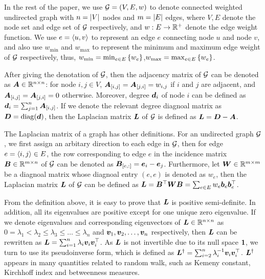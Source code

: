 \documentclass[sigconf]{acmart}
\begin{document}
In the rest of the paper, we use \(\mathcal{G}=(V,E,w)\) to denote connected weighted undirected graph with \(n=\left|V \right|\) nodes and \(m=\left|E \right|\) edges, where \(V,E\) denote the node set and edge set of \(\mathcal{G}\) respectively, and \(w:E\to\mathbb{R}^+\) denote the edge weight function.
We use \(e=\langle u, v \rangle\) to represent an edge \(e\) connecting node \(u\) and node \(v\), and also use \(w_{\min}\) and \(w_{\max}\) to represent the minimum and maximum edge weight of \(\mathcal{G}\) respectively, thus, \(w_{\min}=\min_{e\in E}\left\{w_e \right\}\),\(w_{\max}=\max_{e\in E}\left\{w_e \right\}\).

After giving the denotation of \(\mathcal{G}\), then the adjacency matrix of \(\mathcal{G}\) can be denoted as \(\boldsymbol{A}\in \mathbb{R}^{n\times n}\): for node \(i,j\in V\), \(\boldsymbol{A}_{[i,j]}=\boldsymbol{A}_{[j,i]}=w_{i,j}\) if \(i\) and \(j\) are adjacent, and \(\boldsymbol{A}_{[i,j]}=\boldsymbol{A}_{[j,i]}=0\) otherwise.
Moreover, degree \(\boldsymbol{d}_i\) of node \(i\) can be defined as \(\boldsymbol{d}_i=\sum_{j=1}^n\boldsymbol{A}_{[i,j]}\).
If we denote the relevant degree diagnoal matrix as \(\boldsymbol{D}={\rm{diag}}(\boldsymbol{d})\), then the Laplacian matrix \(\boldsymbol{L}\) of \(\mathcal{G}\) is defined as \(\boldsymbol{L}=\boldsymbol{D}-\boldsymbol{A}\).

The Laplacian matrix of a graph has other definitions.
For an undirected graph \(\mathcal{G}\), we first assign an arbitary direction to each edge in \(\mathcal{G}\), then for edge \(e=\langle i, j \rangle\in E\), the row corresponding to edge \(e\) in the incidence matrix \(\boldsymbol{B}\in\mathbb{R}^{m\times n}\) of \(\mathcal{G}\) can be denoted as \(\boldsymbol{B}_{[e,:]}=\boldsymbol{e}_i-\boldsymbol{e}_j\).
Furthermore, let \(\boldsymbol{W}\in\mathbb{R}^{m\times m}\) be a diagnoal matrix whose diagnoal entry \((e,e)\) is denoted as \(w_e\), then the Laplacian matrix \(\boldsymbol{L}\) of \(\mathcal{G}\) can be defined as \(\boldsymbol{L}=\boldsymbol{B}^\top\boldsymbol{W}\boldsymbol{B}=\sum_{e\in E}w_e\boldsymbol{b}_e\boldsymbol{b}_e^\top\).

From the definition above, it is easy to prove that \(\boldsymbol{L}\) is positive semi-definite.
In addition, all its eigenvalues are positive except for one unique zero eigenvalue.
If we denote eigenvalues and corresponding eigenvectors of \(\boldsymbol{L}\in\mathbb{R}^{n\times n}\) as \(0=\lambda_1<\lambda_2\le\lambda_3\le\dots\le\lambda_n\) and \(\boldsymbol{v}_1,\boldsymbol{v}_2,\dots,\boldsymbol{v}_n\) respectively, then \(\boldsymbol{L}\) can be rewritten as \(\boldsymbol{L}=\sum_{i=1}^n\lambda_i\boldsymbol{v}_i\boldsymbol{v}_i^\top\).
As \(\boldsymbol{L}\) is not invertible due to its null space \(\boldsymbol{1}\), we turn to use its pseudoinverse form, which is defined as \(\boldsymbol{L}^\dagger=\sum_{i=2}^n\lambda_i^{-1}\boldsymbol{v}_i\boldsymbol{v}_i^\top\).
\(\boldsymbol{L}^\dagger\) appears in many quantities related to random walk, such as Kemeny constant, Kirchhoff index and betweenness measures.
\end{document}
